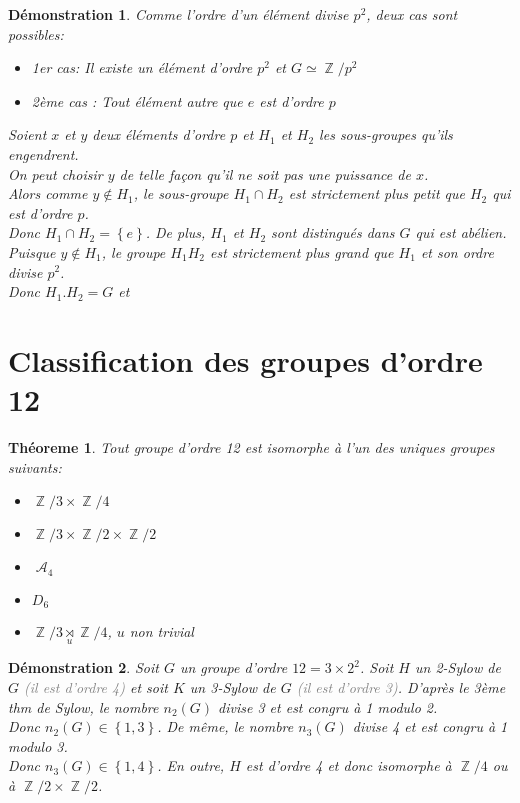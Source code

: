 \documentclass[a4paper, oneside]{report}
\theoremstyle{break}
\newtheorem{thm}{Théoreme}[section] %
\newtheorem*{demonstration}{Démonstration}
\newcommand{\gray}[1]{\textcolor{gray}{#1}}
\DeclareMathOperator{\Z}{\mathbb{Z}}
\DeclareMathOperator{\A}{\mathcal{A}}
\DeclarePairedDelimiter\ens{\left\{ }{\right\} }%
\renewcommand{\ens}[1]{\left\{ #1 \right\} }%
\newcommand{\us}{\underset}
\begin{document}
\begin{demonstration}
Comme l'ordre d'un élément divise $p^2$, deux cas sont possibles:
\begin{itemize}
\item 1er cas: Il existe un élément d'ordre $p^2$ et $G \simeq \Z/p^2$

\item 2ème cas : Tout élément autre que $e$ est d'ordre $p$
\end{itemize}
Soient $x$ et $y$ deux éléments d'ordre $p$ et $H_1$ et $H_2$ les sous-groupes qu'ils engendrent.\\
On peut choisir $y$ de telle façon qu'il ne soit pas une puissance de $x$.\\
Alors comme $y \notin H_1$, le sous-groupe $H_1 \cap H_2$ est strictement plus petit que $H_2$ qui est d'ordre $p$.\\
Donc $H_1 \cap H_2 = \ens{e}$. De plus, $H_1$ et $H_2$ sont distingués dans $G$ qui est abélien.\\
Puisque $y \notin H_1$, le groupe $H_1 H_2$ est strictement plus grand que $H_1$ et son ordre divise $p^2$.\\
Donc $H_1 . H_2 = G$ et 
\end{demonstration}

\section{Classification des groupes d'ordre 12}

\begin{thm}
Tout groupe d'ordre 12 est isomorphe à l'un des uniques groupes suivants:
\begin{itemize}[label=$\bullet$]
\item $\Z/3 \times \Z/4$

\item $\Z/3 \times \Z/2 \times \Z/2$

\item $\A_4$

\item $D_6$

\item $\Z/3 \us{u}{\rtimes} \Z/4$, $u$ non trivial
\end{itemize}
\end{thm}

\begin{demonstration}
Soit $G$ un groupe d'ordre $12 = 3 \times 2^2$. Soit $H$ un 2-Sylow de $G$ \gray{(il est d'ordre 4)} et soit $K$ un 3-Sylow de $G$ \gray{(il est d'ordre 3)}. D'après le 3ème thm de Sylow, le nombre $n_2(G)$ divise 3 et est congru à 1 modulo 2.\\
Donc $n_2(G) \in \ens{1, 3}$. De même, le nombre $n_3(G)$ divise 4 et est congru à 1 modulo 3.\\
Donc $n_3(G) \in \ens{1, 4}$. En outre, $H$ est d'ordre 4 et donc isomorphe à $\Z/4$ ou à $\Z/2 \times \Z/2$.
\end{demonstration}
\end{document}
